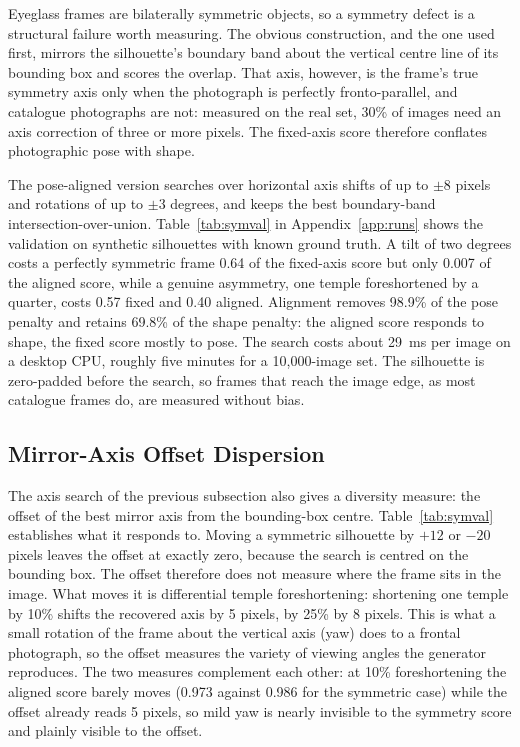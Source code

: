 \documentclass[electronics,article,submit,pdftex,moreauthors]{Definitions/mdpi}
\begin{document}
Eyeglass frames are bilaterally symmetric objects, so a symmetry defect is
a structural failure worth measuring. The obvious construction, and the
one used first, mirrors the silhouette's boundary band about
the vertical centre line of its bounding box and scores the overlap. That
axis, however, is the frame's true symmetry axis only when the photograph
is perfectly fronto-parallel, and catalogue photographs are not: measured
on the real set, 30\% of images need an axis correction of three or
more pixels. The fixed-axis score therefore conflates photographic pose
with shape.

The pose-aligned version searches over horizontal axis shifts of up to
$\pm 8$ pixels and rotations of up to $\pm 3$ degrees, and keeps the best
boundary-band intersection-over-union. Table~\ref{tab:symval} in Appendix~\ref{app:runs} shows the validation on
synthetic silhouettes with known ground truth. A tilt of two degrees costs a perfectly symmetric frame
0.64 of the fixed-axis score but only 0.007 of the aligned score, while a
genuine asymmetry, one temple foreshortened by a quarter, costs 0.57 fixed
and 0.40 aligned. Alignment removes 98.9\% of the pose penalty and
retains 69.8\% of the shape penalty: the aligned score responds to
shape, the fixed score mostly to pose. The search costs about 29~ms per
image on a desktop CPU, roughly five minutes for a 10,000-image set. The silhouette is zero-padded before the search, so frames that reach
the image edge, as most catalogue frames do, are measured without bias.


\subsection{Mirror-Axis Offset Dispersion}
\label{subsec:yaw}

The axis search of the previous subsection also gives a diversity measure:
the offset of the best mirror axis from the bounding-box centre. Table~\ref{tab:symval}
establishes what it responds to. Moving a symmetric silhouette by $+12$ or $-20$ pixels leaves the offset at
exactly zero, because the search is centred on the bounding box. The offset
therefore does not measure where the frame sits in the image. What
moves it is differential temple foreshortening: shortening one temple by
10\% shifts the recovered axis by 5 pixels, by 25\% by 8
pixels. This is what a small rotation of the frame about the vertical axis (yaw)
does to a frontal photograph, so the offset measures the variety of viewing
angles the generator reproduces. The two measures complement each other: at 10\% foreshortening the aligned score barely moves
(0.973 against 0.986 for the symmetric case) while the offset already
reads 5 pixels, so mild yaw is nearly invisible to the symmetry score and
plainly visible to the offset.
\end{document}
